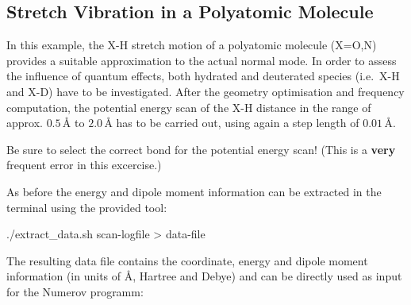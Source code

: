 \documentclass[
  letterpaper,
]{article}
\newenvironment{Shaded}{\begin{snugshade}}{\end{snugshade}}
\newcommand{\ExtensionTok}[1]{\textcolor[rgb]{0.00,0.23,0.31}{#1}}
\newcommand{\NormalTok}[1]{\textcolor[rgb]{0.00,0.23,0.31}{#1}}
\newcommand{\OperatorTok}[1]{\textcolor[rgb]{0.37,0.37,0.37}{#1}}
\begin{document}
\hypertarget{stretch-vibration-in-a-polyatomic-molecule}{%
\subsection*{Stretch Vibration in a Polyatomic
Molecule}\label{stretch-vibration-in-a-polyatomic-molecule}}


In this example, the X-H stretch motion of a polyatomic molecule (X=O,N)
provides a suitable approximation to the actual normal mode. In order to
assess the influence of quantum effects, both hydrated and deuterated
species (i.e.~X-H and X-D) have to be investigated. After the geometry
optimisation and frequency computation, the potential energy scan of the
X-H distance in the range of approx. \(0.5\,\mathrm{Å}\) to
\(2.0\,\mathrm{Å}\) has to be carried out, using again a step length of
\(0.01\,\mathrm{Å}\).

\begin{tcolorbox}[enhanced jigsaw, toptitle=1mm, opacitybacktitle=0.6, colframe=quarto-callout-warning-color-frame, toprule=.15mm, breakable, bottomrule=.15mm, left=2mm, title=\textcolor{quarto-callout-warning-color}{\faExclamationTriangle}\hspace{0.5em}{Careful:}, titlerule=0mm, leftrule=.75mm, bottomtitle=1mm, coltitle=black, arc=.35mm, rightrule=.15mm, opacityback=0, colback=white, colbacktitle=quarto-callout-warning-color!10!white]

Be sure to select the correct bond for the potential energy scan! (This
is a \textbf{very} frequent error in this excercise.)

\end{tcolorbox}

As before the energy and dipole moment information can be extracted in
the terminal using the provided tool:

\begin{Shaded}
\begin{Highlighting}[]
\ExtensionTok{./extract\_data.sh}\NormalTok{    scan{-}logfile     }\OperatorTok{\textgreater{}}\NormalTok{    data{-}file}
\end{Highlighting}
\end{Shaded}

The resulting data file contains the coordinate, energy and dipole
moment information (in units of Å, Hartree and Debye) and can be
directly used as input for the Numerov programm:
\end{document}
